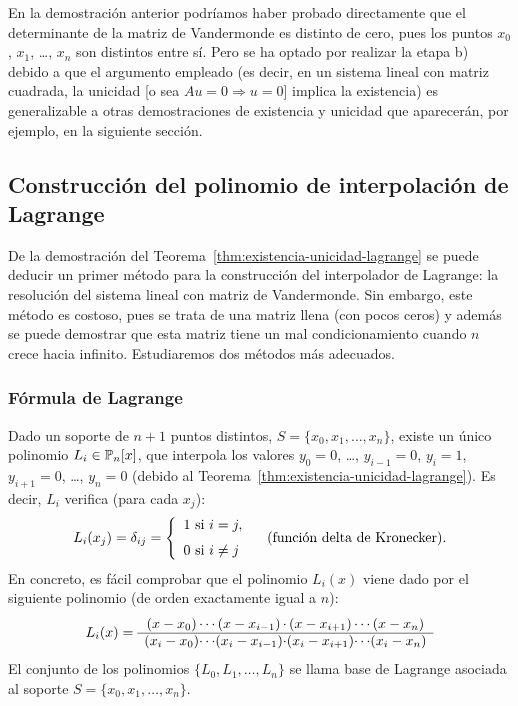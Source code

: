 \begin{remark}
  \label{rk:1}
  En la demostración anterior podríamos haber probado directamente
  que el determinante de la matriz de Vandermonde es distinto de cero,
  pues los puntos $x_0$, $x_1$, \dots, $x_n$ son distintos
  entre sí. Pero se ha optado por realizar la etapa b) debido a que el
  argumento empleado (es decir, en un sistema lineal con matriz
  cuadrada, la unicidad [o sea $Au=0 \Rightarrow u=0$] implica la existencia)
  es generalizable a otras demostraciones de existencia y unicidad que
  aparecerán, por ejemplo, en la siguiente sección.
\end{remark}

\subsection{Construcción del polinomio de interpolación de Lagrange}
\label{sec:construcion--polinomio-lagrange}

De la demostración del Teorema~\ref{thm:existencia-unicidad-lagrange}
se puede deducir un primer método para la construcción del
interpolador de Lagrange: la resolución del sistema lineal con matriz
de Vandermonde. Sin embargo, este método es costoso, pues se trata de
una matriz llena (con pocos ceros) y además se puede demostrar que
esta matriz tiene un mal condicionamiento cuando $n$ crece hacia
infinito. Estudiaremos dos métodos más adecuados.

\subsubsection{Fórmula de Lagrange}
Dado un soporte de $n+1$ puntos distintos, $S=\{x_0,x_1,\dots,x_n\}$,
existe un único polinomio $L_i\in \operatorname{{\mathbb P}}_n[x]$, que interpola los
valores $y_0=0$, \dots, $y_{i-1}=0$, $y_i=1$, $y_{i+1}=0$, \dots,
$y_n=0$ (debido al Teorema~\ref{thm:existencia-unicidad-lagrange}). Es
decir, $L_i$ verifica (para cada $x_j$):
\begin{equation}
  L_i(x_j)= \delta_{ij} = 
  \left\{\begin{array}{l}
      1 \text{ si } i=j, \\\noalign{\medskip} 0 \text{ si } i\neq j
    \end{array}\right. \quad \text{(función delta de Kronecker).}
\end{equation}
En concreto, es fácil comprobar que el polinomio $L_i(x)$ viene dado
por el siguiente polinomio (de orden exactamente igual a $n$):
\begin{equation}
  L_i(x)=
  \begin{array}{c@{}c@{}c@{}c@{}c@{}c@{}c}
    (x-x_0) & \cdots & (x-x_{i-1}) & \cdot & (x-x_{i+1}) & \cdots &
    (x-x_n)
  \\ \hline
    (x_i-x_0) & \cdots & (x_i-x_{i-1}) & \cdot & (x_i-x_{i+1}) & \cdots &
    (x_i-x_n)
  \end{array}
\end{equation}
El conjunto de los polinomios $\{ L_0, L_1,\dots, L_n \}$ se llama
base de Lagrange asociada al soporte $S=\{x_0,x_1,\dots,x_n\}$. 

